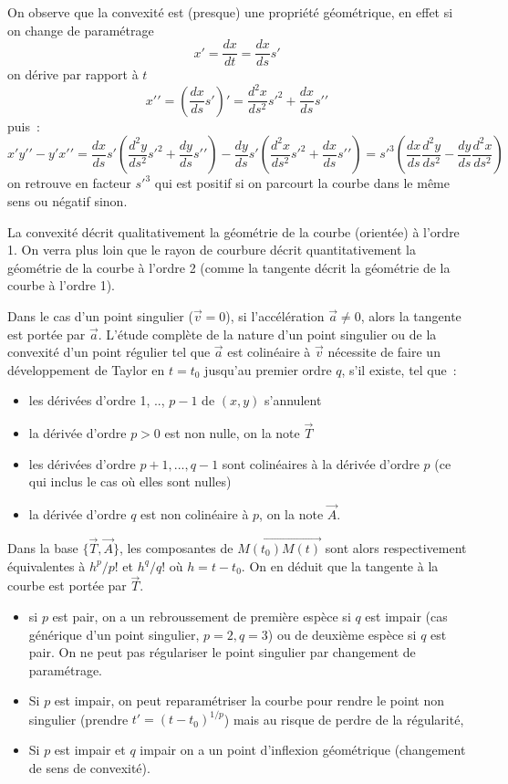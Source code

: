 \documentclass[a4paper,11pt]{book}
\begin{document}
\begin{giacjshere}
On observe que la convexit\'e est (presque) une propri\'et\'e g\'eom\'etrique,
en effet si on change de param\'etrage
$$ x'=\frac{dx}{dt} =\frac{dx}{ds} s' $$
on d\'erive par rapport \`a $t$
$$ x'{'} = (\frac{dx}{ds} s')'=\frac{d^2x}{ds^2} s'^2 + \frac{dx}{ds}
s'{'} $$
puis~:
$$ x'y'{'}- y' x'{'} = 
\frac{dx}{ds} s' (\frac{d^2y}{ds^2} s'^2 +\frac{dy}{ds} s'{'} ) - 
\frac{dy}{ds} s' (\frac{d^2x}{ds^2} s'^2 +\frac{dx}{ds} s'{'} ) 
= s'^3 (\frac{dx}{ds} \frac{d^2y}{ds^2} - 
\frac{dy}{ds} \frac{d^2x}{ds^2} )
 $$
on retrouve en facteur $s'^3$ qui est positif si on parcourt la courbe
dans le m\^eme sens ou n\'egatif sinon.

La convexit\'e d\'ecrit qualitativement la g\'eom\'etrie
de la courbe (orient\'ee) \`a l'ordre 1. 
On verra plus loin que le rayon de courbure d\'ecrit
quantitativement la g\'eom\'etrie de la courbe \`a l'ordre
2 (comme la tangente d\'ecrit la g\'eom\'etrie de la courbe
\`a l'ordre 1).

Dans le cas d'un point singulier ($\overrightarrow{v}=0$), si 
l'acc\'el\'eration $\overrightarrow{a}\neq 0$, alors la
tangente est port\'ee par $\overrightarrow{a}$. L'\'etude compl\`ete
de la nature
d'un point singulier ou de la convexit\'e d'un point r\'egulier
tel que $\overrightarrow{a}$ est colin\'eaire \`a $\overrightarrow{v}$ 
n\'ecessite de faire un
d\'eveloppement de Taylor en $t=t_0$
jusqu'au premier ordre $q$, s'il existe, tel que~: 
\begin{itemize}
\item les d\'eriv\'ees d'ordre 1, .., $p-1$ de $(x,y)$ s'annulent
\item la d\'eriv\'ee d'ordre $p>0$ est non nulle, on la note $\overrightarrow{T}$
\item les d\'eriv\'ees d'ordre $p+1,...,q-1$ sont colin\'eaires
\`a la d\'eriv\'ee d'ordre $p$ (ce qui inclus le cas o\`u elles
sont nulles)
\item la d\'eriv\'ee d'ordre $q$ est non colin\'eaire \`a $p$,
on la note $\overrightarrow{A}$.
\end{itemize}
Dans la base $\{ \overrightarrow{T},\overrightarrow{A}\}$, les
composantes de $\overrightarrow{M(t_0)M(t)}$
sont alors respectivement \'equivalentes \`a $h^p/p!$ et $h^q/q!$
o\`u $h=t-t_0$.
On en d\'eduit que la tangente \`a la courbe est port\'ee par
$\overrightarrow{T}$.
\begin{itemize}
\item si $p$ est pair, on a un rebroussement 
de premi\`ere esp\`ece 
si $q$ est impair (cas g\'en\'erique d'un point singulier, $p=2, q=3$)
ou de deuxi\`eme esp\`ece si $q$ est pair. On ne peut pas
r\'egulariser le point singulier par changement de param\'etrage.
\item Si $p$ est impair, on peut reparam\'etriser la courbe
pour rendre le point non singulier (prendre $t'=(t-t_0)^{1/p}$)
mais au risque de perdre de la r\'egularit\'e,
\item Si $p$ est impair et $q$ impair on a un point d'inflexion 
g\'eom\'etrique (changement de sens de convexit\'e).
\end{itemize}


\end{giacjshere}
\end{document}
